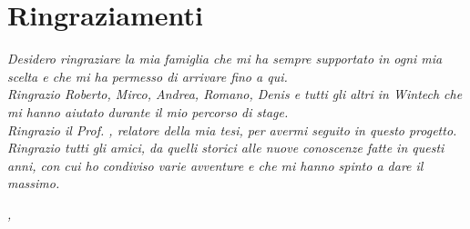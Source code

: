 \cleardoublepage
{}
{}

\bigskip

\begingroup
\let\clearpage\relax
\let\cleardoublepage\relax
\let\cleardoublepage\relax

\chapter*{Ringraziamenti}

\noindent \textit{Desidero ringraziare la mia famiglia che mi ha sempre supportato in ogni mia scelta e che mi ha permesso di arrivare fino a qui.}\\

\noindent \textit{Ringrazio Roberto, Mirco, Andrea, Romano, Denis e tutti gli altri in Wintech che mi hanno aiutato durante il mio percorso di stage.}\\

\noindent \textit{Ringrazio il Prof. \myProf, relatore della mia tesi, per avermi seguito in questo progetto.}\\

\noindent \textit{Ringrazio tutti gli amici, da quelli storici alle nuove conoscenze fatte in questi anni, con cui ho condiviso varie avventure e che mi hanno spinto a dare il massimo.}\\

\bigskip

\noindent\textit{\myLocation, \myTime}
\hfill \myName

\endgroup
